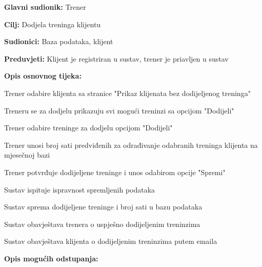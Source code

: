 					\noindent {}
					\begin{packed_item}
	
						\item \textbf{Glavni sudionik: }Trener
						\item  \textbf{Cilj:} Dodjela treninga klijentu
						\item  \textbf{Sudionici:} Baza podataka, klijent
						\item  \textbf{Preduvjeti:} Klijent je registriran u sustav, trener je priavljen u sustav
						\item  \textbf{Opis osnovnog tijeka:}
						
						\item[] \begin{packed_enum}
	
						\item Trener odabire klijenta sa stranice "Prikaz klijenata bez dodijeljenog treninga"
						
                            \item Treneru se za dodjelu prikazuju svi mogući treninzi sa opcijom "Dodijeli"
                            \item Trener odabire treninge za dodjelu opcijom "Dodijeli"
                            \item Trener unosi broj sati predviđenih za odrađivanje odabranih treninga klijenta na mjesečnoj bazi
						\item Trener potvrđuje dodijeljene treninge i unos odabirom opcije "Spremi"
						\item Sustav ispituje ispravnost spremljenih podataka
                            \item Sustav sprema dodijeljene treninge i broj sati u bazu podataka
                            \item Sustav obavještava trenera o uspješno dodijeljenim treninzima
                            \item Sustav obavještava klijenta o dodijeljenim treninzima putem emaila
                            
						\end{packed_enum}
						
						\item  \textbf{Opis mogućih odstupanja:}
						
						\item[] \begin{packed_item}


\end{packed_item}
\end{packed_item}
